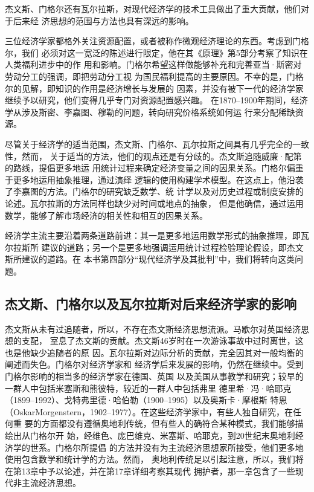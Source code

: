 杰文斯、门格尔还有瓦尔拉斯，对现代经济学的技术工具做出了重大贡献，他们对于后来经
济思想的范围与方法也具有深远的影响。

三位经济学家都格外关注资源配置，或者被称作微观经济理论的东西。考虑到门格尔，我们
必须对这一宽泛的陈述进行限定，他在其《原理》第5部分考察了知识在人类福利进步中的作
用和影响。门格尔希望这样做能够补充和完善亚当·斯密对劳动分工的强调，即把劳动分工视
为国民福利提高的主要原因。不幸的是，门格尔的见解，即知识的作用是经济增长与发展的
因素，并没有被下一代的经济学家继续予以研究，他们变得几乎专门对资源配置感兴趣。
在1870--1900年期间，经济学从涉及斯密、李嘉图、穆勒的问题，转向研究价格系统如何运
行来分配稀缺资源。

尽管关于经济学的适当范围，杰文斯、门格尔、瓦尔拉斯之间具有几乎完全的一致性，然而，
关于适当的方法，他们的观点还是有分歧的。杰文斯追随威廉·配第的路线，提倡更多地运
用统计过程来确定经济变量之间的因果关系。门格尔偏重于更多地运用抽象推理，通过演绎
逻辑的使用构建学术模型。在这点上，他沿袭了李嘉图的方法。门格尔的研究缺乏数学、统
计学以及对历史过程或制度安排的论述。瓦尔拉斯的方法同样也缺少对时间或地点的抽象，
但是他确信，通过运用数学，能够了解市场经济的相关性和相互的因果关系。

经济学主流主要沿着两条道路前进：其一是更多地运用数学形式的抽象推理，即瓦尔拉斯所
建议的道路；另一个是更多地强调运用统计过程检验理论假设，即杰文斯所建议的道路。在
本书第四部分“现代经济学及其批判”中，我们将转向这类问题。

\subsection{杰文斯、门格尔以及瓦尔拉斯对后来经济学家的影响}

杰文斯从未有过追随者，所以，不存在杰文斯经济思想流派。马歇尔对英国经济思想的支配，
室息了杰文斯的贡献。杰文斯46岁时在一次游泳事故中过时离世，这也是他缺少追随者的原
因。瓦尔拉斯对边际分析的贡献，完全因其对一般均衡的阐述而失色。门格尔对经济学家和
经济学后来发展的影响，仍然在继续中。受到门格尔影响的相当多的经济学家在德国、英国
以及美国从事教学和研究；较早的一群人中包括米塞斯和熊彼特，较近的一群人中包括弗里
德里希·冯·哈耶克（1899--1992）、戈特弗里德·哈伯勒（1900--1995）以及奥斯卡·摩根斯
特恩（OskarMorgenstern，1902--1977）。在这些经济学家中，有些人独自研究，在任何重
要的方面都没有遵循奥地利传统，但有些人的确符合某种模式，我们能够描绘出从门格尔开
始，经维色、庞巴维克、米塞斯、哈耶克，到20世纪末奥地利经济学的世系。门格尔所提倡
的方法并没有为主流经济思想家所接受，他们更多地使用包含数学和统计学的方法。然而，
奥地利传统足以引起注意，所以，我们将在第13章中予以论述，并在第17章详细考察其现代
拥护者，那一章包含了一些现代非主流经济思想。

